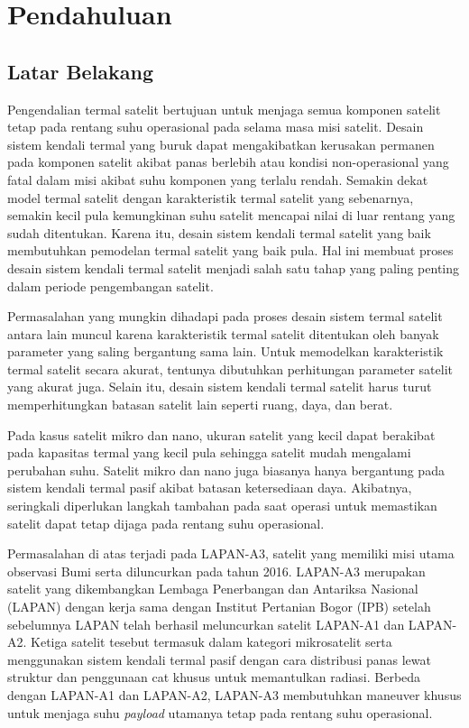 \chapter{Pendahuluan}

\section{Latar Belakang}

Pengendalian termal satelit bertujuan untuk menjaga semua komponen satelit
tetap pada rentang suhu operasional pada selama masa misi satelit. Desain
sistem kendali termal yang buruk dapat mengakibatkan kerusakan permanen pada
komponen satelit akibat panas berlebih atau kondisi non-operasional yang fatal
dalam misi akibat suhu komponen yang terlalu rendah. Semakin dekat model termal
satelit dengan karakteristik termal satelit yang sebenarnya, semakin kecil pula
kemungkinan suhu satelit mencapai nilai di luar rentang yang sudah ditentukan.
Karena itu, desain sistem kendali termal satelit yang baik membutuhkan
pemodelan termal satelit yang baik pula. Hal ini membuat proses desain sistem
kendali termal satelit menjadi salah satu tahap yang paling penting dalam
periode pengembangan satelit.

Permasalahan yang mungkin dihadapi pada proses desain sistem termal satelit
antara lain muncul karena karakteristik termal satelit ditentukan oleh banyak
parameter yang saling bergantung sama lain. Untuk memodelkan karakteristik
termal satelit secara akurat, tentunya dibutuhkan perhitungan parameter satelit
yang akurat juga. Selain itu, desain sistem kendali termal satelit harus turut
memperhitungkan batasan satelit lain seperti ruang, daya, dan berat.

Pada kasus satelit mikro dan nano, ukuran satelit yang kecil dapat berakibat
pada kapasitas termal yang kecil pula sehingga satelit mudah mengalami
perubahan suhu. Satelit mikro dan nano juga biasanya hanya bergantung pada
sistem kendali termal pasif akibat batasan ketersediaan daya. Akibatnya,
seringkali diperlukan langkah tambahan pada saat operasi untuk memastikan
satelit dapat tetap dijaga pada rentang suhu operasional. 

Permasalahan di atas terjadi pada LAPAN-A3, satelit yang memiliki misi utama
observasi Bumi serta diluncurkan pada tahun 2016. LAPAN-A3 merupakan satelit
yang dikembangkan Lembaga Penerbangan dan Antariksa Nasional (LAPAN) dengan
kerja sama dengan Institut Pertanian Bogor (IPB) setelah sebelumnya LAPAN telah
berhasil meluncurkan satelit LAPAN-A1 dan LAPAN-A2. Ketiga satelit tesebut
termasuk dalam kategori mikrosatelit serta menggunakan sistem kendali termal
pasif dengan cara distribusi panas lewat struktur dan penggunaan cat khusus
untuk memantulkan radiasi. Berbeda dengan LAPAN-A1 dan LAPAN-A2,
LAPAN-A3 membutuhkan maneuver khusus untuk menjaga suhu \textit{payload}
utamanya tetap pada rentang suhu operasional.

